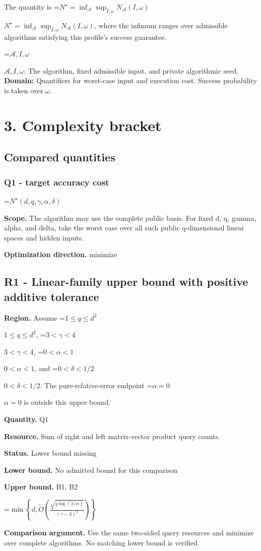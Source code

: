 \documentclass[10pt,a4paper]{article}
\newcommand{\AtlasMath}[1]{\par\begingroup\centering\setbox0=\hbox{$\displaystyle #1$}\ifdim\wd0>1.4\linewidth\typeout{ATLAS WIDE FORMULA: \the\wd0}\fi\ifdim\wd0>\linewidth\resizebox{\linewidth}{!}{\box0}\else\box0\fi\par\endgroup}
\newcommand{\AtlasInlineMath}[1]{\begingroup\setbox0=\hbox{$#1$}\ifdim\wd0>.4\linewidth\endgroup\AtlasMath{#1}\else\endgroup$#1$\fi}
\begin{document}
The quantity is \AtlasInlineMath{N^\star=\inf_{\mathcal A}\sup_{I,\omega}N_{\mathcal A}(I,\omega)}, where the infimum ranges over admissible algorithms satisfying this profile's success guarantee.

\AtlasInlineMath{\mathcal A,I,\omega}: The algorithm, fixed admissible input, and private algorithmic seed. \textbf{Domain:} Quantifiers for worst-case input and execution cost. Success probability is taken over $\omega$.

\section{3. Complexity bracket}
\subsection{Compared quantities}
\subsubsection{Q1 - target accuracy cost}
\AtlasMath{N^\star(d,q,\gamma,\alpha,\delta)}
\textbf{Scope.} The algorithm may use the complete public basis. For fixed d, q, gamma, alpha, and delta, take the worst case over all such public q-dimensional linear spaces and hidden inputs.

\textbf{Optimization direction.} minimize

\subsection{R1 - Linear-family upper bound with positive additive tolerance}
\textbf{Region.} Assume \AtlasInlineMath{1\le q\le d^2}, \AtlasInlineMath{3<\gamma<4}, \AtlasInlineMath{0<\alpha<1}, and \AtlasInlineMath{0<\delta<1/2}. The pure-relative-error endpoint \AtlasInlineMath{\alpha=0} is outside this upper bound.

\textbf{Quantity.} Q1

\textbf{Resource.} Sum of right and left matrix-vector product query counts.

\textbf{Status.} Lower bound missing

\textbf{Lower bound.} No admitted bound for this comparison

\textbf{Upper bound.} B1, B2

\AtlasMath{\min\!\left\{d,\widetilde{O}\!\left(\frac{\sqrt{q\log(1/\alpha)}}{(\gamma-3)^2}\right)\right\}}
\textbf{Comparison argument.} Use the same two-sided query resources and minimize over complete algorithms. No matching lower bound is verified.
\end{document}
